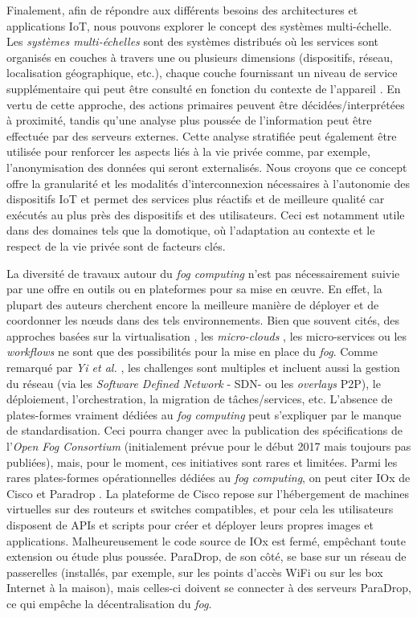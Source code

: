 Finalement, afin de répondre aux différents besoins des architectures et applications IoT, nous pouvons explorer le concept des systèmes multi-échelle. Les \textit {systèmes multi-échelles} sont des systèmes distribués où les services sont organisés en couches à travers une ou plusieurs dimensions (dispositifs, réseau, localisation géographique, etc.), chaque couche fournissant un niveau de service supplémentaire qui peut être consulté en fonction du contexte de l'appareil \cite{Rottenberg2012,Rottenberg2014}.  En vertu de cette approche, des actions primaires peuvent être décidées/interprétées à proximité, tandis qu'une analyse plus poussée de l'information peut être effectuée par des serveurs externes. Cette analyse stratifiée peut également être utilisée pour renforcer les aspects liés à la vie privée comme, par exemple, l'anonymisation des données qui seront externalisés. Nous croyons que ce concept offre la granularité et les modalités d'interconnexion nécessaires à l'autonomie des dispositifs IoT et permet des services plus réactifs et de meilleure qualité car exécutés au plus près des dispositifs et des utilisateurs. Ceci est notamment utile dans des domaines tels que la domotique, où l'adaptation au contexte et le respect de la vie privée sont de facteurs clés.

La diversité de travaux autour du \textit{fog computing} n'est pas nécessairement suivie par une offre en outils ou en plateformes pour sa mise en {\oe}uvre. En effet, la plupart des auteurs cherchent encore la meilleure manière de déployer et de coordonner les n{\oe}uds dans des tels environnements. Bien que souvent cités, des approches basées sur la virtualisation \cite{Satyanarayanan09}, les \textit{micro-clouds} \cite{Elkhatib2017},  les micro-services \cite{Villari2016} ou les \textit{workflows} \cite{Hao2017} ne sont que des possibilités pour la mise en place du \textit{fog}. Comme remarqué par \textit{Yi et al.} \cite{Yi2015}, les challenges sont multiples et incluent aussi la gestion du réseau (via les \textit{Software Defined Network} - SDN- ou les \textit{overlays} P2P), le déploiement, l'orchestration, la migration de tâches/services, etc. L'absence de plates-formes vraiment dédiées au \textit{fog computing} peut s'expliquer par le manque de standardisation. Ceci pourra changer avec la publication des spécifications de l'\textit{Open Fog Consortium} (initialement prévue pour le début 2017 mais toujours pas publiées), mais, pour le moment, ces initiatives sont rares et limitées. Parmi les rares plates-formes opérationnelles dédiées au \textit{fog computing}, on peut citer IOx de Cisco \cite{IOx2017} et Paradrop \cite{Willis2014}. La plateforme de Cisco repose sur l'hébergement de machines virtuelles sur des routeurs et switches compatibles, et pour cela les utilisateurs disposent de APIs et scripts pour créer et déployer leurs propres images et applications. Malheureusement le code source de IOx est fermé, empêchant toute extension ou étude plus poussée. ParaDrop, de son côté, se base sur un réseau de passerelles (installés, par exemple, sur les points d'accès WiFi ou sur les box Internet à la maison), mais celles-ci doivent se connecter à des serveurs ParaDrop, ce qui empêche la décentralisation du \textit{fog}. 

